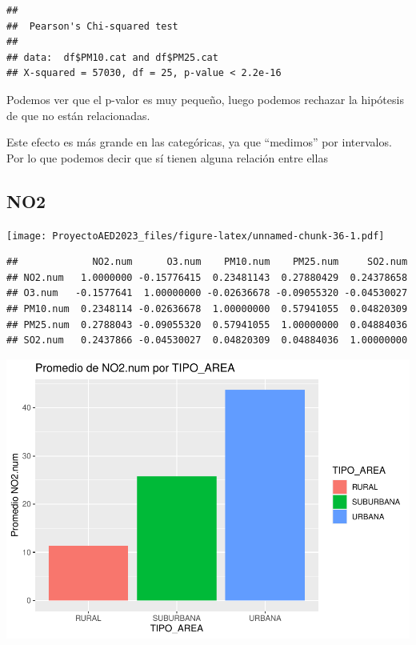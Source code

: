 \documentclass[notspecified,article,submit,moreauthors,pdftex]{Definitions/mdpi}
\newenvironment{Shaded}{\begin{snugshade}}{\end{snugshade}}
\newcommand{\AttributeTok}[1]{\textcolor[rgb]{0.13,0.29,0.53}{#1}}
\newcommand{\FunctionTok}[1]{\textcolor[rgb]{0.13,0.29,0.53}{\textbf{#1}}}
\newcommand{\NormalTok}[1]{#1}
\newcommand{\SpecialCharTok}[1]{\textcolor[rgb]{0.81,0.36,0.00}{\textbf{#1}}}
\begin{document}
\begin{Shaded}
\end{Shaded}

\begin{verbatim}
## 
##  Pearson's Chi-squared test
## 
## data:  df$PM10.cat and df$PM25.cat
## X-squared = 57030, df = 25, p-value < 2.2e-16
\end{verbatim}

Podemos ver que el p-valor es muy pequeño, luego podemos rechazar la
hipótesis de que no están relacionadas.

Este efecto es más grande en las categóricas, ya que ``medimos'' por
intervalos. Por lo que podemos decir que sí tienen alguna relación entre
ellas

\hypertarget{no2}{%
\subsection{NO2}\label{no2}}

\texttt{[image: ProyectoAED2023\_files/figure-latex/unnamed-chunk-36-1.pdf]}

\begin{verbatim}
##             NO2.num      O3.num    PM10.num    PM25.num     SO2.num
## NO2.num   1.0000000 -0.15776415  0.23481143  0.27880429  0.24378658
## O3.num   -0.1577641  1.00000000 -0.02636678 -0.09055320 -0.04530027
## PM10.num  0.2348114 -0.02636678  1.00000000  0.57941055  0.04820309
## PM25.num  0.2788043 -0.09055320  0.57941055  1.00000000  0.04884036
## SO2.num   0.2437866 -0.04530027  0.04820309  0.04884036  1.00000000
\end{verbatim}

\includegraphics{ProyectoAED2023_files/figure-latex/unnamed-chunk-38-1.pdf}
\end{document}
